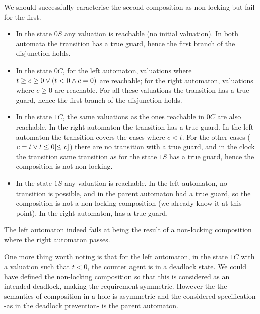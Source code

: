\documentclass{article}
\begin{document}
\begin{exi}
We should successfully caracterise the second composition as non-locking but fail for the first.
\begin{itemize}
\item In the state \(0S\) any valuation is reachable (no initial valuation).
	In both automata the transition  has a true guard, hence the first branch of the disjunction holds.
\item In the state \(0C\), for the left automaton, valuations where \(t \geq c \geq 0 \vee {\left(t < 0 \wedge c = 0\right)}\) are reachable; for the right automaton, valuations where \(c \geq 0\) are reachable.
	For all these valuations the transition  has a true guard, hence the first branch of the disjunction holds.
\item In the state \(1C\), the same valuations as the ones reachable in \(0C\) are also reachable.
	In the right automaton the transition  has a true guard.
	In the left automaton the transition  covers the cases where \(c < t\).
	For the other cases (\(c = t \vee t \leq 0 {\left[\leq c\right]}\)) there are no transition with a true guard, and in the clock the transition same transition as for the state \(1S\) has a true guard, hence the composition is not non-locking.
\item In the state \(1S\) any valuation is reachable.
	In the left automaton, no transition is possible, and in the parent automaton  had a true guard, so the composition is not a non-locking composition (we already know it at this point).
	In the right automaton,  has a true guard.
\end{itemize}
The left automaton indeed fails at being the result of a non-locking composition where the right automaton passes.

One more thing worth noting is that for the left automaton, in the state \(1C\) with a valuation such that \(t < 0\), the counter agent is in a deadlock state.
We could have defined the non-locking composition so that this is considered as an intended deadlock, making the requirement symmetric.
However the the semantics of composition in a hole is asymmetric and the considered specification -as in the deadlock prevention- is the parent automaton.
\end{exi}
\end{document}
